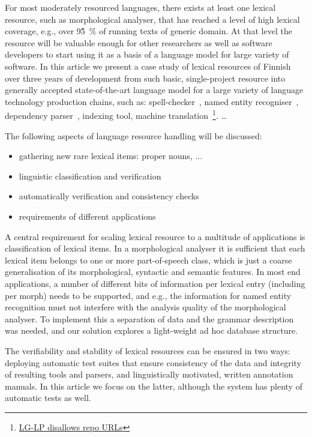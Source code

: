 \documentclass[11pt]{article}
\begin{document}
For most moderately resourced languages, there exists at least one lexical
resource, such as morphological analyser, that has reached a level of high
lexical coverage, e.g., over 95̃~\% of running texts of generic domain.
At that level the resource will be valuable enough
for other researchers as well as software developers to start using it as a
basis of a language model for large variety of software. In this article we
present a case study of lexical resources of Finnish over three years of
development from such basic, single-project resource into generally accepted
state-of-the-art language model for a large variety of language technology
production chains, such as: spell-checker~\cite{pirinen2014weighted},
named entity recogniser~\cite{}, dependency parser~\cite{bohnet2013joint}, indexing tool,
machine translation~\footnote{\url{LG-LP disallows repo URLs}}. \ldots

The following aspects of language resource handling will be discussed:
\begin{itemize}
    \item gathering new rare lexical items: proper nouns, ...
    \item linguistic classification and verification
    \item automatically verification and consistency checks
    \item requirements of different applications
\end{itemize}

A central requirement for scaling lexical resource to a multitude of
applications is classification of lexical items. In a morphological analyser
it is sufficient that each lexical item belongs to one or more part-of-speech
class, which is just a coarse generalisation of its morphological, syntactic and
semantic features. In most end applications, a number of different bits of
information per lexical entry (including per morph) needs to be supported,
and e.g., the information for named entity recognition must not interfere
with the analysis quality of the morphological analyser. To implement this
a separation of data and the grammar description was needed, and our solution
explores a light-weight ad hoc database structure.

The verifiability and stability of lexical resources can be ensured in two
ways: deploying automatic test suites that ensure consistency of the data and
integrity of resulting tools and parsers, and linguistically motivated, written
annotation manuals. In this article we focus on the latter, although the system
has plenty of automatic tests as well.
\end{document}
